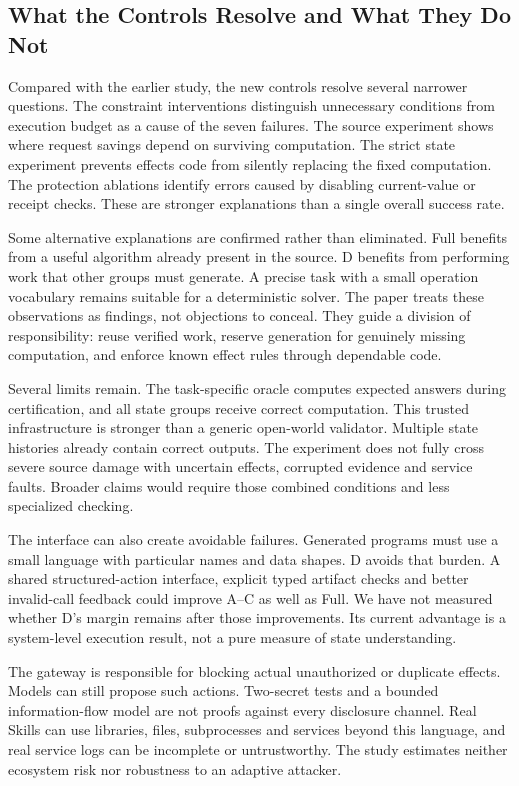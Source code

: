\documentclass[conference]{IEEEtran}
\begin{document}
\subsection{What the Controls Resolve and What They Do Not}
Compared with the earlier study, the new controls resolve several narrower questions. The constraint interventions distinguish unnecessary conditions from execution budget as a cause of the seven failures. The source experiment shows where request savings depend on surviving computation. The strict state experiment prevents effects code from silently replacing the fixed computation. The protection ablations identify errors caused by disabling current-value or receipt checks. These are stronger explanations than a single overall success rate.

Some alternative explanations are confirmed rather than eliminated. Full benefits from a useful algorithm already present in the source. D benefits from performing work that other groups must generate. A precise task with a small operation vocabulary remains suitable for a deterministic solver. The paper treats these observations as findings, not objections to conceal. They guide a division of responsibility: reuse verified work, reserve generation for genuinely missing computation, and enforce known effect rules through dependable code.

Several limits remain. The task-specific oracle computes expected answers during certification, and all state groups receive correct computation. This trusted infrastructure is stronger than a generic open-world validator. Multiple state histories already contain correct outputs. The experiment does not fully cross severe source damage with uncertain effects, corrupted evidence and service faults. Broader claims would require those combined conditions and less specialized checking.

The interface can also create avoidable failures. Generated programs must use a small language with particular names and data shapes. D avoids that burden. A shared structured-action interface, explicit typed artifact checks and better invalid-call feedback could improve A--C as well as Full. We have not measured whether D's margin remains after those improvements. Its current advantage is a system-level execution result, not a pure measure of state understanding.

The gateway is responsible for blocking actual unauthorized or duplicate effects. Models can still propose such actions. Two-secret tests and a bounded information-flow model are not proofs against every disclosure channel. Real Skills can use libraries, files, subprocesses and services beyond this language, and real service logs can be incomplete or untrustworthy. The study estimates neither ecosystem risk nor robustness to an adaptive attacker.
\end{document}
